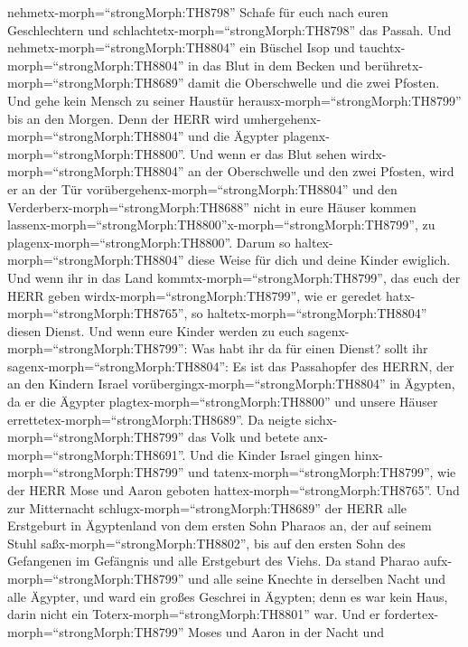 nehmetx-morph=``strongMorph:TH8798'' Schafe für euch nach euren
Geschlechtern und schlachtetx-morph=``strongMorph:TH8798'' das Passah.
 Und nehmetx-morph=``strongMorph:TH8804'' ein Büschel Isop
und tauchtx-morph=``strongMorph:TH8804'' in das Blut in dem Becken und
berühretx-morph=``strongMorph:TH8689'' damit die Oberschwelle und die
zwei Pfosten. Und gehe kein Mensch zu seiner Haustür
herausx-morph=``strongMorph:TH8799'' bis an den Morgen. 
Denn der HERR wird umhergehenx-morph=``strongMorph:TH8804'' und die
Ägypter plagenx-morph=``strongMorph:TH8800''. Und wenn er das Blut sehen
wirdx-morph=``strongMorph:TH8804'' an der Oberschwelle und den zwei
Pfosten, wird er an der Tür vorübergehenx-morph=``strongMorph:TH8804''
und den Verderberx-morph=``strongMorph:TH8688'' nicht in eure Häuser
kommen
lassenx-morph=``strongMorph:TH8800''x-morph=``strongMorph:TH8799'', zu
plagenx-morph=``strongMorph:TH8800''.  Darum so
haltex-morph=``strongMorph:TH8804'' diese Weise für dich und deine
Kinder ewiglich.  Und wenn ihr in das Land
kommtx-morph=``strongMorph:TH8799'', das euch der HERR geben
wirdx-morph=``strongMorph:TH8799'', wie er geredet
hatx-morph=``strongMorph:TH8765'', so
haltetx-morph=``strongMorph:TH8804'' diesen Dienst.  Und
wenn eure Kinder werden zu euch sagenx-morph=``strongMorph:TH8799'': Was
habt ihr da für einen Dienst?  sollt ihr
sagenx-morph=``strongMorph:TH8804'': Es ist das Passahopfer des HERRN,
der an den Kindern Israel vorübergingx-morph=``strongMorph:TH8804'' in
Ägypten, da er die Ägypter plagtex-morph=``strongMorph:TH8800'' und
unsere Häuser errettetex-morph=``strongMorph:TH8689''. Da neigte
sichx-morph=``strongMorph:TH8799'' das Volk und betete
anx-morph=``strongMorph:TH8691''.  Und die Kinder Israel
gingen hinx-morph=``strongMorph:TH8799'' und
tatenx-morph=``strongMorph:TH8799'', wie der HERR Mose und Aaron geboten
hattex-morph=``strongMorph:TH8765''.  Und zur Mitternacht
schlugx-morph=``strongMorph:TH8689'' der HERR alle Erstgeburt in
Ägyptenland von dem ersten Sohn Pharaos an, der auf seinem Stuhl
saßx-morph=``strongMorph:TH8802'', bis auf den ersten Sohn des
Gefangenen im Gefängnis und alle Erstgeburt des Viehs.  Da
stand Pharao aufx-morph=``strongMorph:TH8799'' und alle seine Knechte in
derselben Nacht und alle Ägypter, und ward ein großes Geschrei in
Ägypten; denn es war kein Haus, darin nicht ein
Toterx-morph=``strongMorph:TH8801'' war.  Und er
fordertex-morph=``strongMorph:TH8799'' Moses und Aaron in der Nacht und
